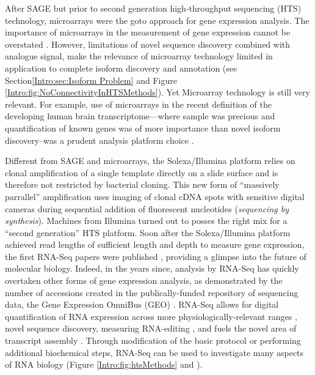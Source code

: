    After SAGE but prior to second generation high-throughput sequencing (HTS) technology, microarrays were the goto approach for gene expression analysis. The importance of microarrays in the measurement of gene expression cannot be overstated \citep{Shendure2008,Marioni2008}. However, limitations of novel sequence discovery combined with analogue signal, make the relevance of microarray technology limited in application to complete isoform discovery and annotation (see Section\ref{Intro:sec:Isoform Problem} and Figure \ref{Intro:fig:NoConnectivityInHTSMethods}). Yet Microarray technology is still very relevant. For example, use of microarrays in the recent definition of the developing human brain transcriptome---where sample was precious and quantification of known genes was of more importance than novel isoform discovery--was a prudent analysis platform choice \cite{Miller2014}.

    Different from SAGE and microarrays, the Solexa/Illumina platform relies on clonal amplification of a single template directly on a slide surface and is therefore not restricted by bacterial cloning. This new form of ``massively parrallel'' amplification uses imaging of clonal cDNA spots with sensitive digital cameras during sequential addition of fluorescent nucleotides (\textit{sequencing by synthesis}). Machines from Illumina turned out to posses the right mix for a ``second generation'' HTS platform. Soon after the Solexa/Illumina platform achieved read lengths of sufficient length and depth to measure gene expression, the first RNA-Seq papers were published \citep{Mortazavi2008, Nagalakshmi2008,Lister2008}, providing a glimpse into the future of molecular biology. Indeed, in the years since, analysis by RNA-Seq has quickly overtaken other forms of gene expression analysis, as demonstrated by the number of accessions created in the publically-funded repository of sequencing data, the Gene Expression OmniBus (GEO) \citep{Barrett2013}. RNA-Seq allows for digital quantification of RNA expression across more physiologically-relevant ranges \citep{Blencowe2009}, novel sequence discovery, measuring RNA-editing \citep{Li2011}, and fuels the novel area of transcript assembly \citep{Trapnell2010}. Through modification of the basic protocol or performing additional biochemical steps, RNA-Seq can be used to investigate many aspects of RNA biology (Figure \ref{Intro:fig:htsMethods} and \citep{Mutz2013}).


